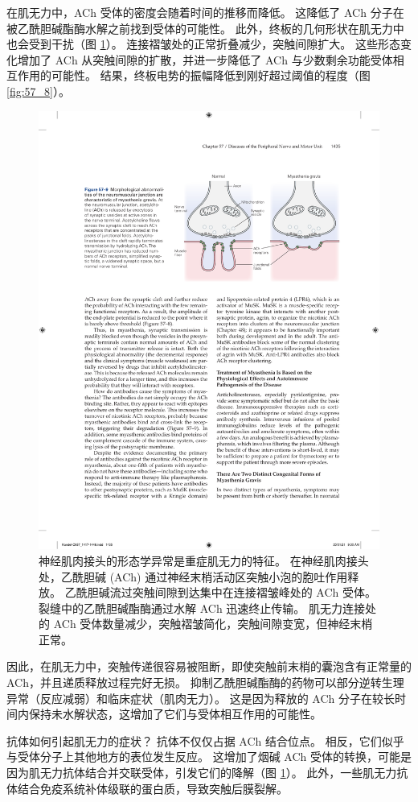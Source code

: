 在肌无力中，ACh 受体的密度会随着时间的推移而降低。
这降低了 ACh 分子在被乙酰胆碱酯酶水解之前找到受体的可能性。
此外，终板的几何形状在肌无力中也会受到干扰（图 \ref{fig:57_9}）。
连接褶皱处的正常折叠减少，突触间隙扩大。
这些形态变化增加了 ACh 从突触间隙的扩散，并进一步降低了 ACh 与少数剩余功能受体相互作用的可能性。
结果，终板电势的振幅降低到刚好超过阈值的程度（图 \ref{fig:57_8}）。


\begin{figure}[htbp]
	\centering
	\includegraphics[width=0.65\linewidth]{chap57/fig_57_9}
	\caption{神经肌肉接头的形态学异常是重症肌无力的特征。 在神经肌肉接头处，乙酰胆碱 (ACh) 通过神经末梢活动区突触小泡的胞吐作用释放。 乙酰胆碱流过突触间隙到达集中在连接褶皱峰处的 ACh 受体。 裂缝中的乙酰胆碱酯酶通过水解 ACh 迅速终止传输。 肌无力连接处的 ACh 受体数量减少，突触褶皱简化，突触间隙变宽，但神经末梢正常。}
	\label{fig:57_9}
\end{figure}


因此，在肌无力中，突触传递很容易被阻断，即使突触前末梢的囊泡含有正常量的 ACh，并且递质释放过程完好无损。
抑制乙酰胆碱酯酶的药物可以部分逆转生理异常（反应减弱）和临床症状（肌肉无力）。
这是因为释放的 ACh 分子在较长时间内保持未水解状态，这增加了它们与受体相互作用的可能性。


抗体如何引起肌无力的症状？
抗体不仅仅占据 ACh 结合位点。
相反，它们似乎与受体分子上其他地方的表位发生反应。
这增加了烟碱 ACh 受体的转换，可能是因为肌无力抗体结合并交联受体，引发它们的降解（图 \ref{fig:57_9}）。
此外，一些肌无力抗体结合免疫系统补体级联的蛋白质，导致突触后膜裂解。


